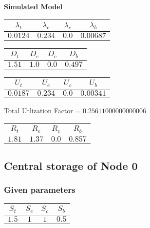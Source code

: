 \documentclass{article}
\begin{document}
\begin{minipage}{0.5\textwidth}
\centering	\textbf{Simulated Model}
\begin{table}[H]
\centering
\begin{tabular}{@{}cccc@{}}
\toprule
$\lambda_t$ & $\lambda_e$ & $\lambda_c$ & $\lambda_b$\\
\midrule
$0.0124$ & $0.234$ & $0.0$ & $0.00687$\\
\bottomrule
\end{tabular}
\end{table}
\begin{table}[H]
\centering
\begin{tabular}{@{}cccc@{}}
\toprule
$D_t$ & $D_e$ & $D_c$ & $D_b$\\
\midrule
$1.51$ & $1.0$ & $0.0$ & $0.497$\\
\bottomrule
\end{tabular}
\end{table}\begin{table}[H]
\centering
\begin{tabular}{@{}cccc@{}}
\toprule
$U_t$ & $U_e$ & $U_c$ & $U_b$\\
\midrule
$0.0187$ & $0.234$ & $0.0$ & $0.00341$\\
\bottomrule
\end{tabular}
\end{table}
\centering Total Utlization Factor = $0.25611000000000006$
\begin{table}[H]
\centering
\begin{tabular}{@{}cccc@{}}
\toprule
$R_t$ & $R_e$ & $R_c$ & $R_b$\\
\midrule
$1.81$ & $1.37$ & $0.0$ & $0.857$\\
\bottomrule
\end{tabular}
\end{table}
\end{minipage}\subsection{Central storage of Node 0}
\subsubsection{Given parameters}
\begin{table}[H]
\centering
\begin{tabular}{@{}cccc@{}}
\toprule
$S_t$ & $S_e$ & $S_c$ & $S_b$\\
\midrule
$1.5$ & $1$ & $1$ & $0.5$\\
\bottomrule
\end{tabular}
\end{table}
\end{document}
